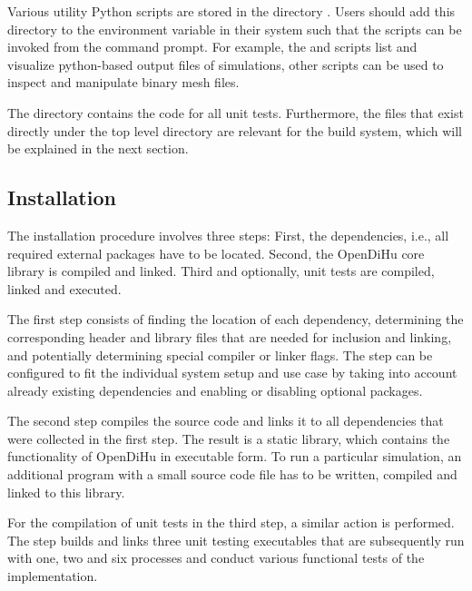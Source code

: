 Various utility Python scripts are stored in the directory . Users should add this directory to the  environment variable in their system such that the scripts can be invoked from the command prompt. For example, the  and  scripts list and visualize python-based output files of simulations, other scripts can be used to inspect and manipulate binary mesh files.

The directory  contains the code for all unit tests. Furthermore, the files that exist directly under the top level  directory are relevant for the build system, which will be explained in the next section.

\subsection{Installation}\label{sec:installation}

The installation procedure involves three steps: First, the dependencies, i.e., all required external packages have to be located. Second, the OpenDiHu core library is compiled and linked. Third and optionally, unit tests are compiled, linked and executed.

The first step consists of finding the location of each dependency, determining the corresponding header and library files that are needed for inclusion and linking, and potentially determining special compiler or linker flags. The step can be configured to fit the individual system setup and use case by taking into account already existing dependencies and enabling or disabling optional packages.

The second step compiles the source code and links it to all dependencies that were collected in the first step. The result is a static library, which contains the functionality of OpenDiHu in executable form. To run a particular simulation, an additional program with a small source code file has to be written, compiled and linked to this library.

For the compilation of unit tests in the third step, a similar action is performed. The step builds and links three unit testing executables that are subsequently run with one, two and six processes and conduct various functional tests of the implementation.

